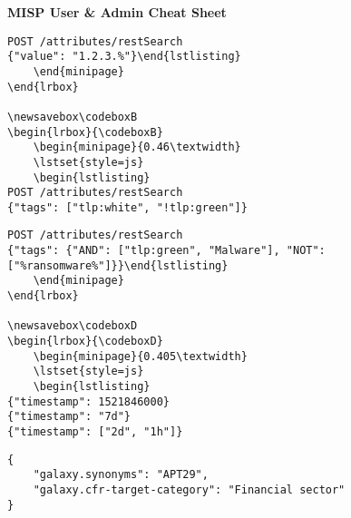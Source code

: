 \begin{center}{
    \huge{\textbf{MISP User \& Admin Cheat Sheet}}}\\
\end{center}

\newsavebox\codeboxA
\begin{lrbox}{\codeboxA}
    \begin{minipage}{0.46\textwidth}
    \lstset{style=js}
    \begin{lstlisting}
POST /attributes/restSearch
{"value": "1.2.3.%"}\end{lstlisting}
    \end{minipage}
\end{lrbox}

\newsavebox\codeboxB
\begin{lrbox}{\codeboxB}
    \begin{minipage}{0.46\textwidth}
    \lstset{style=js}
    \begin{lstlisting}
POST /attributes/restSearch
{"tags": ["tlp:white", "!tlp:green"]}\end{lstlisting}
    \end{minipage}
\end{lrbox}

\newsavebox\codeboxC
\begin{lrbox}{\codeboxC}
    \begin{minipage}{0.46\textwidth}
    \lstset{style=js}
    \begin{lstlisting}
POST /attributes/restSearch
{"tags": {"AND": ["tlp:green", "Malware"], "NOT": ["%ransomware%"]}}\end{lstlisting}
    \end{minipage}
\end{lrbox}

\newsavebox\codeboxD
\begin{lrbox}{\codeboxD}
    \begin{minipage}{0.405\textwidth}
    \lstset{style=js}
    \begin{lstlisting}
{"timestamp": 1521846000}
{"timestamp": "7d"}
{"timestamp": ["2d", "1h"]}\end{lstlisting}
    \end{minipage}
\end{lrbox}

\newsavebox\codeboxE
\begin{lrbox}{\codeboxE}
    \begin{minipage}{0.46\textwidth}
    \lstset{style=js}
    \begin{lstlisting}
{
    "galaxy.synonyms": "APT29",
    "galaxy.cfr-target-category": "Financial sector"
}\end{lstlisting}
    \end{minipage}
\end{lrbox}

